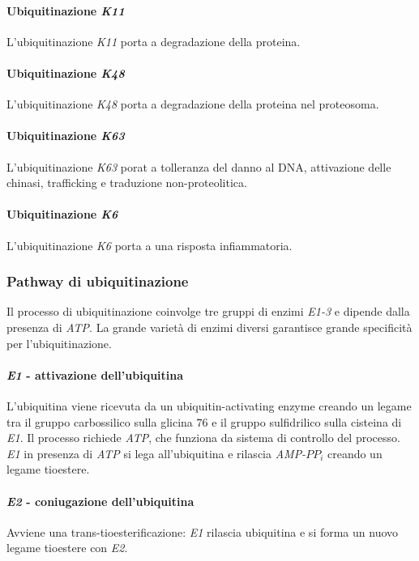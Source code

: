 \paragraph{Ubiquitinazione \emph{K11}}
L'ubiquitinazione \emph{K11} porta a degradazione della proteina.
\paragraph{Ubiquitinazione \emph{K48}}
L'ubiquitinazione \emph{K48} porta a degradazione della proteina nel proteosoma.
\paragraph{Ubiquitinazione \emph{K63}}
L'ubiquitinazione \emph{K63} porat a tolleranza del danno al DNA, attivazione delle chinasi, trafficking e traduzione non-proteolitica. 
\paragraph{Ubiquitinazione \emph{K6}}
L'ubiquitinazione \emph{K6} porta a una risposta infiammatoria.
\subsubsection{Pathway di ubiquitinazione}
Il processo di ubiquitinazione coinvolge tre gruppi di enzimi \emph{E1-3} e dipende dalla presenza di \emph{ATP}. La grande variet\`a di enzimi diversi garantisce grande specificit\`a per 
l'ubiquitinazione.
\paragraph{\emph{E1} - attivazione dell'ubiquitina}
L'ubiquitina viene ricevuta da un ubiquitin-activating enzyme creando un legame tra il gruppo carbossilico sulla glicina $76$ e il gruppo sulfidrilico sulla cisteina di \emph{E1}. Il processo
richiede \emph{ATP}, che funziona da sistema di controllo del processo. \emph{E1} in presenza di \emph{ATP} si lega all'ubiquitina e rilascia \emph{AMP-$PP_i$} creando un legame tioestere. 
\paragraph{\emph{E2} - coniugazione dell'ubiquitina}
Avviene una trans-tioesterificazione: \emph{E1} rilascia ubiquitina e si forma un nuovo legame tioestere con \emph{E2}.
